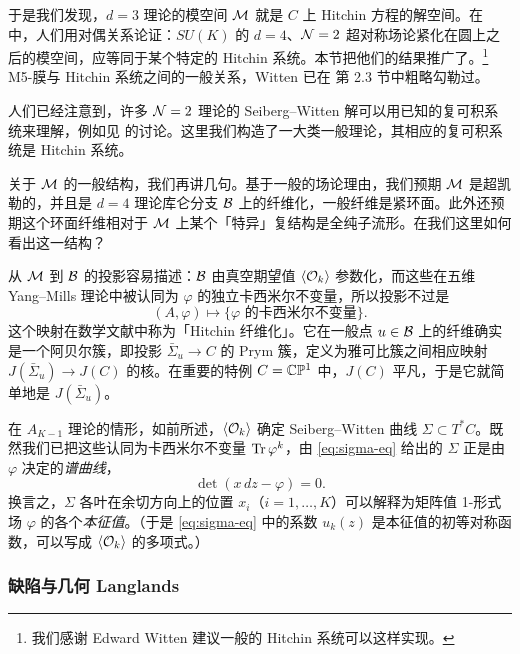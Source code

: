 于是我们发现，$d=3$ 理论的模空间 $\mathcal{M}$ 就是 $C$ 上 Hitchin 方程的解空间。在 \cite{Cherkis:1997aa,Gukov:1998kt,Kapustin:1998xn,Cherkis:2000cj} 中，人们用对偶关系论证：$SU(K)$ 的 $d=4$、$\mathcal{N}=2$ 超对称场论紧化在圆上之后的模空间，应等同于某个特定的 Hitchin 系统。本节把他们的结果推广了。\footnote{我们感谢 Edward Witten 建议一般的 Hitchin 系统可以这样实现。} M5-膜与 Hitchin 系统之间的一般关系，Witten 已在 \cite{Witten:1997sc} 第 2.3 节中粗略勾勒过。

人们已经注意到，许多 $\mathcal{N}=2$ 理论的 Seiberg–Witten 解可以用已知的复可积系统来理解，例如见 \cite{Gorsky:1995zq,Martinec:1995by,Donagi:1996cf,Itoyama:1995nv} 的讨论。这里我们构造了一大类一般理论，其相应的复可积系统是 Hitchin 系统。

关于 $\mathcal{M}$ 的一般结构，我们再讲几句。基于一般的场论理由\cite{Seiberg:1996nz}，我们预期 $\mathcal{M}$ 是超凯勒的，并且是 $d=4$ 理论库仑分支 $\mathcal{B}$ 上的纤维化，一般纤维是紧环面。此外还预期这个环面纤维相对于 $\mathcal{M}$ 上某个「特异」复结构是全纯子流形。在我们这里如何看出这一结构？

从 $\mathcal{M}$ 到 $\mathcal{B}$ 的投影容易描述：$\mathcal{B}$ 由真空期望值 $\langle \mathcal{O}_k \rangle$ 参数化，而这些在五维 Yang–Mills 理论中被认同为 $\varphi$ 的独立卡西米尔不变量，所以投影不过是
\begin{equation}
(A, \varphi) \mapsto \{ \text{$\varphi$ 的卡西米尔不变量} \}.
\end{equation}
这个映射在数学文献中称为「Hitchin 纤维化」\cite{MR89a:32021}。它在一般点 $u \in \mathcal{B}$ 上的纤维确实是一个阿贝尔簇，即投影 $\bar\Sigma_u \to C$ 的 Prym 簇，定义为雅可比簇之间相应映射 $J(\bar \Sigma_u) \to J(C)$ 的核。在重要的特例 $C = \mathbb{C}\mathbb{P}^1$ 中，$J(C)$ 平凡，于是它就简单地是 $J(\bar\Sigma_u)$。

在 $A_{K-1}$ 理论的情形，如前所述，$\langle \mathcal{O}_k \rangle$ 确定 Seiberg–Witten 曲线 $\Sigma \subset T^* C$。既然我们已把这些认同为卡西米尔不变量 $\operatorname{Tr} \varphi^k$，由 \eqref{eq:sigma-eq} 给出的 $\Sigma$ 正是由 $\varphi$ 决定的\emph{谱曲线}，
\begin{equation}\label{eq:speccurve}
\det (x\,dz - \varphi) = 0.
\end{equation}
换言之，$\Sigma$ 各叶在余切方向上的位置 $x_i$（$i = 1, \dots, K$）可以解释为矩阵值 1-形式场 $\varphi$ 的各个\emph{本征值}。（于是 \eqref{eq:sigma-eq} 中的系数 $u_k(z)$ 是本征值的初等对称函数，可以写成 $\langle \mathcal{O}_k \rangle$ 的多项式。）

\subsubsection{缺陷与几何 Langlands} \label{sec:defects}


